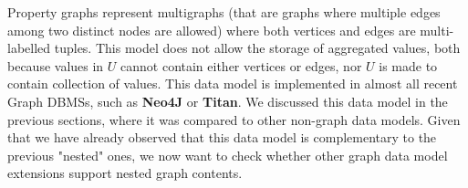 Property graphs represent multigraphs (that are graphs where multiple edges among two distinct nodes are allowed) where both vertices and edges are multi-labelled tuples. This model does not allow the storage of aggregated values, both because values in $U$ cannot contain either vertices or edges, nor $U$ is made to contain collection of values.  This data model is implemented in almost all recent  Graph DBMSs, such as \textbf{Neo4J} \cite{Robinson} or \textbf{Titan}. We discussed this data model in the previous sections, where it was compared to other non-graph data models. Given that we have already observed that this data model is complementary to the previous "nested" ones, we now want to check whether other graph data model extensions support nested graph contents.



